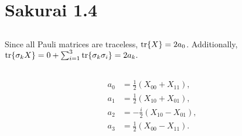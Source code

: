 \documentclass[
a4paper,
10pt,
twoside,
]{article}
\begin{document}
\section{Sakurai 1.4}
\subsection{}%
Since all Pauli matrices are traceless, $\tr{X}= 2a_0$.
Additionally, $\tr{\sigma_k X} = 0 + \sum_{i=1}^3\tr{\sigma_k\sigma_i} = 2a_k.$

\subsection{}%
\begin{align}
	a_0 &= \frac{1}{2}\left(X_{00} + X_{11}\right),\\
	a_1 &= \frac{1}{2}\left(X_{10} + X_{01}\right),\\
	a_2 &= -\frac{i}{2}\left(X_{10} - X_{01}\right),\\
	a_3 &= \frac{1}{2}\left(X_{00} - X_{11}\right).
\end{align}
\end{document}
